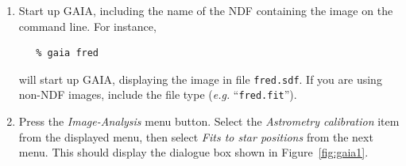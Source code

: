 \documentclass[twoside,11pt]{article}
\newcommand{\latex}[1]{#1}
\newcommand{\html}[1]{}
\renewcommand{\_}{\texttt{\symbol{95}}}
\begin{document}
\begin{enumerate}

\item Start up GAIA, including the name of the NDF containing the image
on the command line. For instance, 

\begin{verbatim}
   % gaia fred
\end{verbatim}

will start up GAIA, displaying the image in file \texttt{fred.sdf}. If you 
are using non-NDF images, include the file type (\emph{e.g.} ``\texttt{fred.fit}'').

\item Press the \emph{Image-Analysis} menu button. Select the
\emph{Astrometry calibration} item from the displayed menu, then select 
\emph{Fits to star positions} from the next menu. This should display the
dialogue box shown in \latex{Figure~\ref{fig:gaia1}.} \html{the next figure:}


\end{enumerate}
\end{document}

